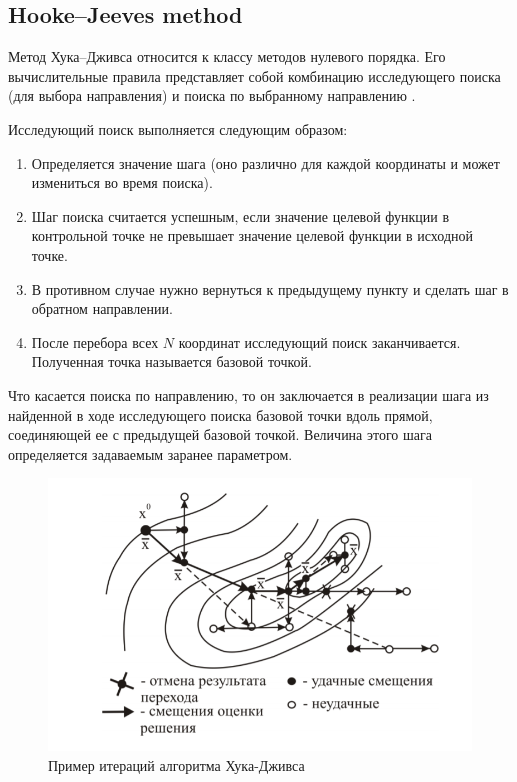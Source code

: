 \documentclass{svproc}
\begin{document}
\subsection{Hooke--Jeeves method}\label{SecHG}

Метод Хука–Дживса относится к классу методов нулевого порядка. Его вычислительные правила представляет собой комбинацию исследующего поиска (для выбора направления) и поиска по выбранному направлению \cite{fio_bib14, fio_bib15}.

Исследующий поиск выполняется следующим образом: 
\begin{enumerate}
\item	Определяется значение шага (оно различно для каждой координаты и может измениться во время поиска). 
\item	Шаг поиска считается успешным, если значение целевой функции в контрольной точке не превышает значение целевой функции в исходной точке. 
\item	В противном случае нужно вернуться к предыдущему пункту и сделать шаг в обратном направлении. 
\item	После перебора всех $N$ координат исследующий поиск заканчивается. Полученная точка называется базовой точкой.
\end{enumerate}




Что касается поиска по направлению, то он заключается в реализации шага из найденной в ходе исследующего поиска базовой точки вдоль прямой, соединяющей ее с предыдущей базовой точкой. Величина этого шага определяется задаваемым заранее параметром.

\begin{figure}[!h]
	\begin{center}
		\begin{minipage}[h]{0.8\linewidth}
			\includegraphics[width=1\linewidth]{figure/fig1.png}
			\caption{Пример итераций алгоритма Хука-Дживса} %
			\label{fig:fig1}
		\end{minipage}
	\end{center}
\end{figure}	
\end{document}
